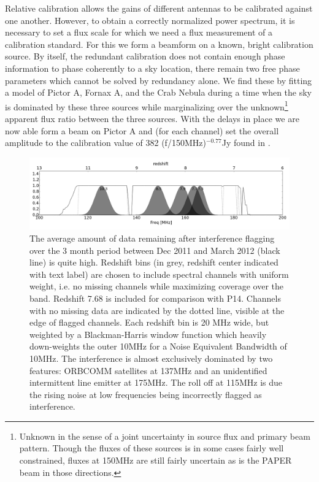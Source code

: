 \documentclass[preprint2]{aastex}
\begin{document}
Relative calibration allows the gains of different antennas to be calibrated against one another.  However, to obtain a correctly normalized power spectrum, it is necessary to set a flux scale for which we need a flux measurement of a calibration standard.  For this we form a beamform on a known, bright calibration source.  By itself, the redundant calibration does not contain enough phase information to phase coherently to a sky location, there remain two free phase parameters which cannot be solved by redundancy alone.   We find these by fitting a model of Pictor A, Fornax A, and the Crab Nebula during a time when the sky is dominated by these three sources while marginalizing over the unknown\footnote{Unknown in the sense of a joint uncertainty in source flux and primary beam pattern. Though the fluxes of these sources is in some cases fairly well constrained, fluxes at 150MHz are still fairly uncertain as is the PAPER beam in those directions.} apparent flux ratio between the three sources. With the delays in place we are now able form a beam on Pictor A and (for each channel) set the overall amplitude to the calibration value of 382 (f/150MHz)$^{-0.77}$Jy found in \cite{jacobs:2013b}.
  
  
 \begin{figure}
\centering
\includegraphics[width=\textwidth]{figures/psa32_flagging_zbins.png}
\caption{\label{fig:bins} The average amount of data remaining after interference flagging over the 3 month period between Dec 2011 and March 2012 (black line) is quite high.  Redshift bins (in grey, redshift center indicated with text label) are chosen to include spectral channels with uniform weight, i.e. no missing channels while maximizing coverage over the band.  Redshift 7.68 is included for comparison with P14.  Channels with no missing data are indicated by the dotted line, visible at the edge of flagged channels. Each redshift bin is 20 MHz wide, but weighted by a Blackman-Harris window function which heavily down-weights the outer 10MHz for a Noise Equivalent Bandwidth of 10MHz.  The interference is almost exclusively dominated by two features: ORBCOMM satellites at 137MHz and an unidentified intermittent line emitter at 175MHz. The roll off at 115MHz is due the rising noise at low frequencies being incorrectly flagged as interference.  }
\end{figure} 
\end{document}
